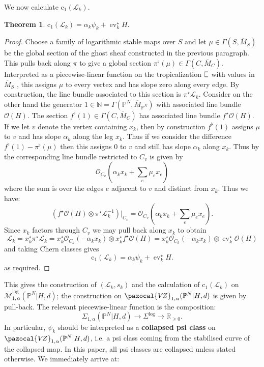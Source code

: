 \documentclass[11pt]{amsart}
\newcommand{\sqC}{\scalebox{0.8}[1.3]{$\sqsubset$}}
\newcommand{\MLog}{\overline{\mathcal{M}}^{\operatorname{log}}}
\newcommand{\PP}{\mathbb P}
\newcommand{\VZ}{\pazocal{V\!Z}}
\newcommand{\st}{\star}
\newcommand{\N}{\mathbb{N}}
\newcommand{\OO}{\mathcal{O}}
\renewcommand{\to}{\rightarrow}
\newcommand{\ev}{\operatorname{ev}}
\newcommand{\Lcal}{\mathcal{L}}
\newcommand{\cchern}{\mathrm{c}}
\newcommand{\ol}[1]{\overline{#1}}
\newcommand{\RR}{\mathbb{R}}
\theoremstyle{definition}
\newtheorem{thm}{Theorem}[section]
\theoremstyle{definition}
\begin{document}
We now calculate $\cchern_1(\Lcal_k)$. 
\begin{thm} $\cchern_1(\Lcal_k) = \alpha_k \psi_k + \ev_k^\st H.$\end{thm}
\begin{proof}
Choose a family of logarithmic stable maps over $S$ and let $\mu \in \Gamma(S,\ol{M}_S)$ be the global section of the ghost sheaf constructed in the previous paragraph. This pulls back along $\pi$ to give a global section $\pi^\flat(\mu) \in \Gamma(C,\ol{M}_C)$.  Interpreted as a piecewise-linear function on the tropicalization $\sqC$ with values in $\ol{M}_S$ \cite[Remark 7.3]{CavalieriChanUlirschWise}, this assigns $\mu$ to every vertex and has slope zero along every edge. By construction, the line bundle associated to this section is $\pi^\st \Lcal_k$. Consider on the other hand the generator $1 \in \N = \Gamma(\PP^N,\ol{M}_{\PP^N})$ with associated line bundle $\OO(H)$. The section $f^\flat(1) \in \Gamma(C,\ol{M}_C)$ has associated line bundle $f^\st\OO(H)$. If we let $v$ denote the vertex containing $x_k$, then by construction $f^\flat(1)$ assigns $\mu$ to $v$ and has slope $\alpha_k$ along the leg $x_k$. Thus if we consider the difference $f^\flat(1) - \pi^\flat(\mu)$ then this assigns $0$ to $v$ and still has slope $\alpha_k$ along $x_k$. Thus by \cite[Proposition 2.4.1]{RSPW} the corresponding line bundle restricted to $C_v$ is given by
\begin{equation*} \OO_{C_v} \left(\alpha_k x_k + \sum_e \mu_e x_e \right) \end{equation*}
where the sum is over the edges $e$ adjacent to $v$ and distinct from $x_k$. Thus we have:
\begin{equation*} \left( f^\st\OO(H) \otimes \pi^\st \Lcal_k^{-1} \right) \big|_{C_v} = \OO_{C_v} \left(\alpha_k x_k + \sum_e \mu_e x_e \right).\end{equation*}
Since $x_k$ factors through $C_v$ we may pull back along $x_k$ to obtain
\begin{equation*} \Lcal_k = x_k^\st\pi^\st \Lcal_k = x_k^\st \OO_{C_k}(-\alpha_k x_k) \otimes x_k^\st f^\st\OO(H) = x_k^\st \OO_{C_k}(-\alpha_k x_k) \otimes \ev_k^\st \OO(H) \end{equation*}
and taking Chern classes gives
\begin{equation*} \cchern_1(\Lcal_k) = \alpha_k \psi_k + \ev_k^\st H.\end{equation*}
as required.\end{proof}
This gives the construction of $(\Lcal_k,s_k)$ and the calculation of $\cchern_1(\Lcal_k)$ on $\MLog_{1,\alpha}(\PP^N|H,d)$; the construction on $\VZ_{1,\alpha}(\PP^N|H,d)$ is given by pull-back. The relevant piecewise-linear function is the composition:
\begin{equation*} \Sigma_{1,\alpha}(\PP^N|H,d) \to \Sigma^{\log} \to \RR_{\geq 0}.\end{equation*}
In particular, $\psi_k$ should be interpreted as a \textbf{collapsed psi class} on $\VZ_{1,\alpha}(\PP^N|H,d)$, i.e. a psi class coming from the stabilised curve of the collapsed map. In this paper, all psi classes are collapsed unless stated otherwise. We immediately arrive at:
\end{document}
